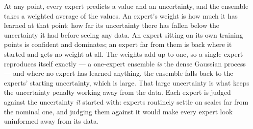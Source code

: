 At any point, every expert predicts a value and an uncertainty, and the ensemble takes a weighted
average of the values. An expert's weight is how much it has learned at that point: how far its
uncertainty there has fallen below the uncertainty it had before seeing any data. An expert sitting
on its own training points is confident and dominates; an expert far from them is back where it
started and gets no weight at all. The weights add up to one, so a single expert reproduces itself
exactly --- a one-expert ensemble \emph{is} the dense Gaussian process --- and where no expert has
learned anything, the ensemble falls back to the experts' starting uncertainty, which is large. That
large uncertainty is what keeps the uncertainty penalty working away from the data. Each expert is
judged against the uncertainty \emph{it} started with: experts routinely settle on scales far from
the nominal one, and judging them against it would make every expert look uninformed away from its
data.

